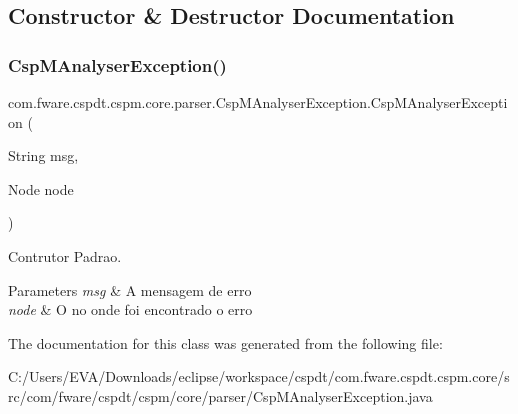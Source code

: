 \subsection{Constructor \& Destructor Documentation}
\mbox{\label{classcom_1_1fware_1_1cspdt_1_1cspm_1_1core_1_1parser_1_1_csp_m_analyser_exception_a4223ce06d5b1dedd5b60bf823488c7cf}} 
\subsubsection{\texorpdfstring{Csp\+M\+Analyser\+Exception()}{CspMAnalyserException()}}
{\footnotesize\ttfamily com.\+fware.\+cspdt.\+cspm.\+core.\+parser.\+Csp\+M\+Analyser\+Exception.\+Csp\+M\+Analyser\+Exception (\begin{DoxyParamCaption}\item[{String}]{msg,  }\item[{Node}]{node }\end{DoxyParamCaption})\hspace{0.3cm}{\ttfamily [inline]}}



Contrutor Padrao. 


\begin{DoxyParams}{Parameters}
{\em msg} & A mensagem de erro \\
\hline
{\em node} & O no onde foi encontrado o erro \\
\hline
\end{DoxyParams}


The documentation for this class was generated from the following file\+:\begin{DoxyCompactItemize}
\item 
C\+:/\+Users/\+E\+V\+A/\+Downloads/eclipse/workspace/cspdt/com.\+fware.\+cspdt.\+cspm.\+core/src/com/fware/cspdt/cspm/core/parser/Csp\+M\+Analyser\+Exception.\+java\end{DoxyCompactItemize}
